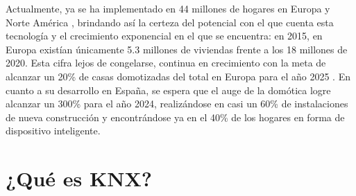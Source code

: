 Actualmente, ya se ha implementado en 44 millones de hogares en Europa y Norte América \cite{HT:2014}, brindando así la certeza del potencial con el que cuenta esta tecnología y el crecimiento exponencial en el que se encuentra: en 2015, en Europa existían únicamente 5.3 millones de viviendas frente a los 18 millones de 2020. Esta cifra lejos de congelarse, continua en crecimiento con la meta de alcanzar un 20\% de casas domotizadas del total en Europa para el año 2025 \cite{Berg:2020}. En cuanto a su desarrollo en España, se espera que el auge de la domótica logre alcanzar un 300\% para el año 2024, realizándose en casi un 60\% de instalaciones de nueva construcción \cite{Portal:2020} y encontrándose ya en el 40\% de los hogares en forma de dispositivo inteligente.

\newpage
\section{¿Qué es KNX?}

